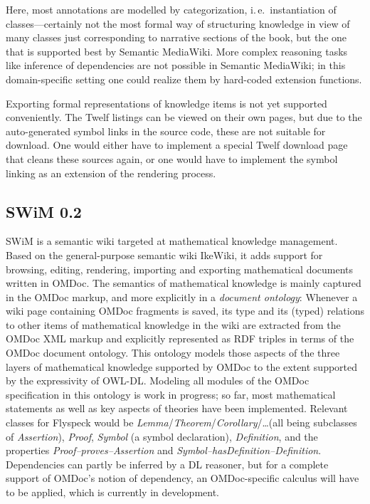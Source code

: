 Here, most annotations are modelled by categorization, i.\,e.\ instantiation of
classes---certainly not the most formal way of structuring knowledge in view of
many classes just corresponding to narrative sections of the book, but the one
that is supported best by Semantic MediaWiki.  More complex reasoning tasks like
inference of dependencies are not possible in Semantic MediaWiki; in this
domain-specific setting one could realize them by hard-coded extension
functions.

Exporting formal representations of knowledge items is not yet supported
conveniently.  The Twelf listings can be viewed on their own pages, but due to
the auto-generated symbol links in the source code, these are not suitable for
download.  One would either have to implement a special Twelf download page that
cleans these sources again, or one would have to implement the symbol linking as
an extension of the rendering process.

\subsection{SWiM 0.2}
\label{sec:swim}

SWiM is a semantic wiki targeted at mathematical knowledge management.  Based on
the general-purpose semantic wiki IkeWiki\cite{KrSchVr:semwiki-reasoning07}, it
adds support for browsing, editing, rendering, importing and exporting
mathematical documents written in OMDoc.  The semantics of mathematical
knowledge is mainly captured in the OMDoc markup, and more explicitly in a
\emph{document ontology}: Whenever a wiki page containing OMDoc fragments is
saved, its type and its (typed) relations to other items of mathematical
knowledge in the wiki are extracted from the OMDoc XML markup and explicitly
represented as RDF triples in terms of the OMDoc document
ontology\cite{OMDocDocOnto:web}.  This ontology models those aspects of the
three layers of mathematical knowledge supported by OMDoc to the extent
supported by the expressivity of OWL-DL.  Modeling all modules of the OMDoc
specification in this ontology is work in progress; so far, most mathematical
statements as well as key aspects of theories have been implemented.  Relevant
classes for Flyspeck would be
\textit{Lemma}/\textit{Theorem}/\textit{Corollary}/\ldots (all being subclasses
of \textit{Assertion}), \textit{Proof}, \textit{Symbol} (a symbol declaration),
\textit{Definition}, and the properties \textit{Proof--proves--Assertion} and
\textit{Symbol--hasDefinition--Definition}.  Dependencies can partly be inferred
by a DL reasoner, but for a complete support of OMDoc's notion of dependency, an
OMDoc-specific calculus will have to be applied, which is currently in
development.

